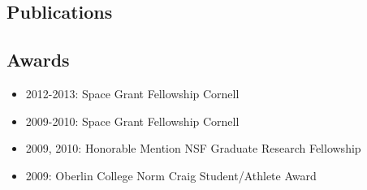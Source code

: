 \documentclass[11pt, oneside]{article}   	%
\begin{document}
\vspace{-0.2in}
\subsection*{Publications}
\nocite{schlawin2018kic1255Normal}
\nocite{schlawin2018JWSTforecasts}
\nocite{schlawin2014}
\nocite{schlawin2017dhs}
\nocite{schlawin2017bdVar}
\nocite{greene2017jatisNIRCam}
\nocite{greene2016slitlessGrisms}
\nocite{schlawin2016kic1255}
\nocite{schlawin2010}
\nocite{schlawin2016kic1255}
\nocite{schlawin2014TSpec}
\nocite{muirheadKOI961}
\nocite{dale2009spitzerAnthology}
\nocite{west2011sloanMdwarf}
\nocite{muirhead2012}
\nocite{johnson2012}
\nocite{muirheadKOI961}
\nocite{muirhead2014coolKOIIV}

\begingroup
\renewcommand{\section}[2]{}%


\endgroup

%
%

\vspace{-0.15in}
\subsection*{Awards}
\begin{itemize}[noitemsep]
        \item 2012-2013: Space Grant Fellowship Cornell
        \item 2009-2010: Space Grant Fellowship Cornell
        \item 2009, 2010: Honorable Mention NSF Graduate Research Fellowship 
        \item 2009: Oberlin College Norm Craig Student/Athlete Award
\end{itemize}
\end{document}
